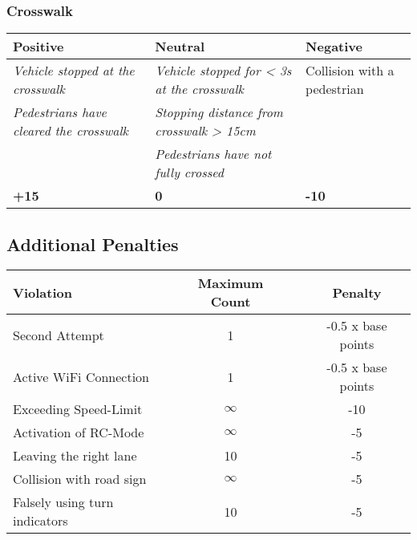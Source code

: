{	\subsubsection*{Crosswalk}
	\begin{table}[H]
		\begin{tabularx}{\textwidth}{XXX}
			\toprule
			\textbf{Positive}                                               & \textbf{Neutral}                                                   & \textbf{Negative}           \\
			\midrule
			\textit{Vehicle stopped at the crosswalk}\footnotemark[2]       & \textit{Vehicle stopped for < 3s at the crosswalk}\footnotemark[2] & Collision with a pedestrian \\
			\textit{Pedestrians have cleared the crosswalk}\footnotemark[2] & \textit{Stopping distance from crosswalk > 15cm}\footnotemark[2]   &                             \\
			                                                                & \textit{Pedestrians have not fully crossed}\footnotemark[2]        &                             \\
			\topstrut
			\textbf{+15}                                                    & \textbf{0}                                                         & \textbf{-10}                \\
			\bottomrule
		\end{tabularx}
	\end{table}


	\subsection*{Additional Penalties}
	\begin{table}[H]
		\begin{tabular}{@{}lccc@{}}
			\toprule
			\textbf{Violation}            & \textbf{Maximum Count} &  & \textbf{Penalty}   \\
			\midrule
			Second Attempt                & 1                      &  & -0.5 x base points \\
			Active WiFi Connection        & 1                      &  & -0.5 x base points \\
			Exceeding Speed-Limit         & $\infty$               &  & -10                \\
			Activation of RC-Mode         & $\infty$               &  & -5                 \\
			Leaving the right lane        & 10                     &  & -5                 \\
			Collision with road sign      & $\infty$               &  & -5                 \\
			Falsely using turn indicators & 10                     &  & -5                 \\
			\bottomrule
		\end{tabular}
	\end{table}
	\clearpage
}